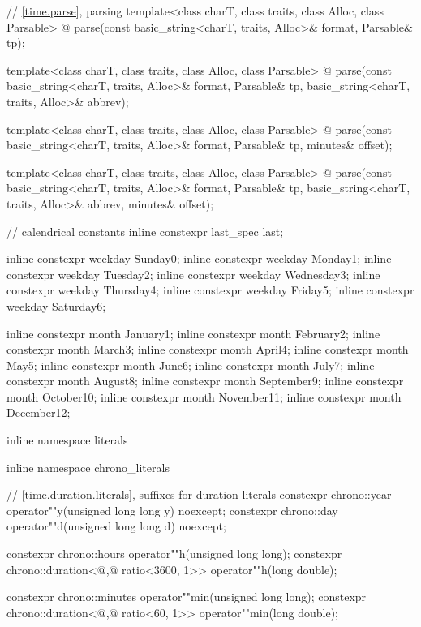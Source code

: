 \begin{codeblock}
{{    // \ref{time.parse}, parsing
    template<class charT, class traits, class Alloc, class Parsable>
      @\unspec@
        parse(const basic_string<charT, traits, Alloc>& format, Parsable& tp);

    template<class charT, class traits, class Alloc, class Parsable>
      @\unspec@
        parse(const basic_string<charT, traits, Alloc>& format, Parsable& tp,
              basic_string<charT, traits, Alloc>& abbrev);

    template<class charT, class traits, class Alloc, class Parsable>
      @\unspec@
        parse(const basic_string<charT, traits, Alloc>& format, Parsable& tp,
              minutes& offset);

    template<class charT, class traits, class Alloc, class Parsable>
      @\unspec@
        parse(const basic_string<charT, traits, Alloc>& format, Parsable& tp,
              basic_string<charT, traits, Alloc>& abbrev, minutes& offset);

    // calendrical constants
    inline constexpr last_spec last{};

    inline constexpr weekday Sunday{0};
    inline constexpr weekday Monday{1};
    inline constexpr weekday Tuesday{2};
    inline constexpr weekday Wednesday{3};
    inline constexpr weekday Thursday{4};
    inline constexpr weekday Friday{5};
    inline constexpr weekday Saturday{6};

    inline constexpr month January{1};
    inline constexpr month February{2};
    inline constexpr month March{3};
    inline constexpr month April{4};
    inline constexpr month May{5};
    inline constexpr month June{6};
    inline constexpr month July{7};
    inline constexpr month August{8};
    inline constexpr month September{9};
    inline constexpr month October{10};
    inline constexpr month November{11};
    inline constexpr month December{12};
  }

  inline namespace literals {
  inline namespace chrono_literals {
    // \ref{time.duration.literals}, suffixes for duration literals
    constexpr chrono::year operator""y(unsigned long long y) noexcept;
    constexpr chrono::day  operator""d(unsigned long long d) noexcept;

    constexpr chrono::hours                                 operator""h(unsigned long long);
    constexpr chrono::duration<@\unspec,@ ratio<3600, 1>> operator""h(long double);

    constexpr chrono::minutes                             operator""min(unsigned long long);
    constexpr chrono::duration<@\unspec,@ ratio<60, 1>> operator""min(long double);

}}}
\end{codeblock}
